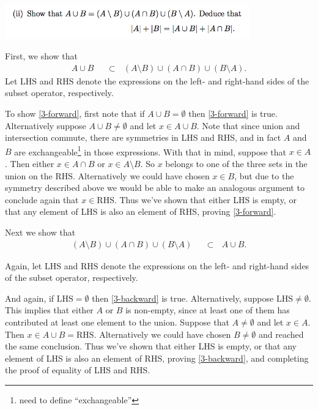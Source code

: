 \documentclass[12pt]{article}
\newcommand{\LHS}{\text{LHS}}
\newcommand{\RHS}{\text{RHS}}
\begin{document}
\includegraphics[width=300pt]{img/iulm-1-3-ii.png}
\begin{mdframed}

First, we show that
\begin{align}
  A \cup B ~~~ &\subset ~~~ (A \setminus B) \cup (A \cap B) \cup (B \setminus A).\label{3-forward}
\end{align}
Let $\LHS$ and $\RHS$ denote the expressions on the left- and right-hand sides
of the subset operator, respectively.

To show \eqref{3-forward}, first note that if $A \cup B = \emptyset$ then
\eqref{3-forward} is true. Alternatively suppose $A \cup B \neq \emptyset$ and
let $x \in A \cup B$. Note that since union and intersection commute, there are
symmetries in LHS and RHS, and in fact $A$ and $B$ are
exchangeable\footnote{need to define ``exchangeable''} in those
expressions. With that in mind, suppose that $x \in A$. Then either
$x \in A \cap B$ or $x \in A \setminus B$. So $x$ belongs to one of the three
sets in the union on the RHS. Alternatively we could have chosen $x \in B$, but
due to the symmetry described above we would be able to make an analogous
argument to conclude again that $x \in \RHS$. Thus we've shown that either LHS
is empty, or that any element of LHS is also an element of RHS, proving
\eqref{3-forward}.

Next we show that
\begin{align}
  (A \setminus B) \cup (A \cap B) \cup (B \setminus A) ~~~ &\subset ~~~ A \cup B. \label{3-backward}
\end{align}

Again, let $\LHS$ and $\RHS$ denote the expressions on the left- and right-hand
sides of the subset operator, respectively.

And again, if $\LHS = \emptyset$ then \eqref{3-backward} is
true. Alternatively, suppose $\LHS \neq \emptyset$. This implies that either
$A$ or $B$ is non-empty, since at least one of them has contributed at least
one element to the union. Suppose that $A \neq \emptyset$ and let $x \in
A$. Then $x \in A \cup B = \RHS$. Alternatively we could have chosen
$B \neq \emptyset$ and reached the same conclusion. Thus we've shown that
either LHS is empty, or that any element of LHS is also an element of RHS,
proving \eqref{3-backward}, and completing the proof of equality of LHS and
RHS.


\end{mdframed}
\end{document}
